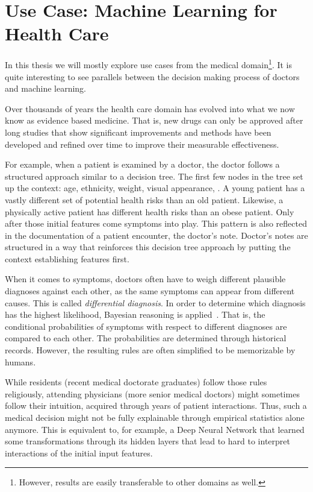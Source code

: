 \section{Use Case: Machine Learning for Health Care}
In this thesis we will mostly explore use cases from the medical domain\footnote{However, results are easily transferable to other domains as well.}.
It is quite interesting to see parallels between the decision making process of doctors and machine learning.

Over thousands of years the health care domain has evolved into what we now know as evidence based medicine.
That is, new drugs can only be approved after long studies that show significant improvements and methods have been developed and refined over time to improve their measurable effectiveness.

For example, when a patient is examined by a doctor, the doctor follows a structured approach similar to a decision tree.
The first few nodes in the tree set up the context: age, ethnicity, weight, visual appearance, \etc.
A young patient has a vastly different set of potential health risks than an old patient.
Likewise, a physically active patient has different health risks than an obese patient.
Only after those initial features come symptoms into play.
This pattern is also reflected in the documentation of a patient encounter, the doctor's note.
Doctor's notes are structured in a way that reinforces this decision tree approach by putting the context establishing features first.

When it comes to symptoms, doctors often have to weigh different plausible diagnoses against each other, as the same symptoms can appear from different causes.
This is called \emph{differential diagnosis}.
In order to determine which diagnosis has the highest likelihood, Bayesian reasoning is applied~\cite{mdbook}.
That is, the conditional probabilities of symptoms with respect to different diagnoses are compared to each other.
The probabilities are determined through historical records.
However, the resulting rules are often simplified to be memorizable by humans.

While residents (recent medical doctorate graduates) follow those rules religiously, attending physicians (more senior medical doctors) might sometimes follow their intuition, acquired through years of patient interactions.
Thus, such a medical decision might not be fully explainable through empirical statistics alone anymore.
This is equivalent to, for example, a Deep Neural Network that learned some transformations through its hidden layers that lead to hard to interpret interactions of the initial input features.

